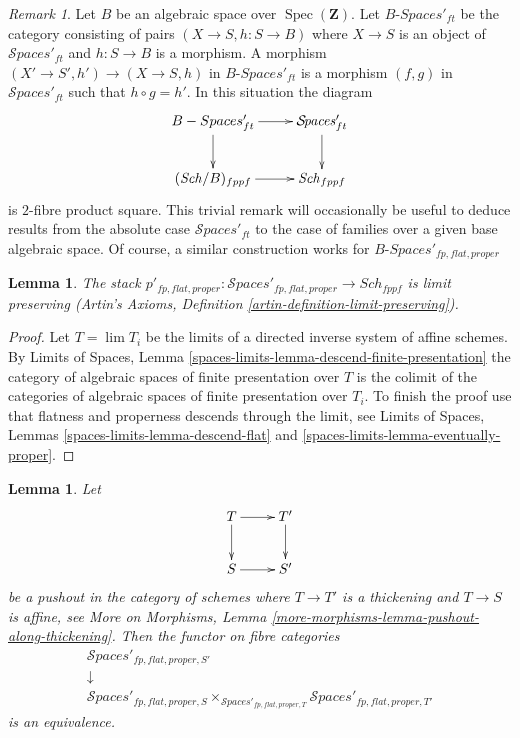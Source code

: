 \documentclass{stacks-project}
\theoremstyle{plain}
\newtheorem{lemma}[subsection]{Lemma}
\theoremstyle{definition}
\theoremstyle{remark}
\newtheorem{remark}[subsection]{Remark}
\numberwithin{equation}{subsection}
\def\lim{\mathop{\mathrm{lim}}\nolimits}
\def\Spec{\mathop{\mathrm{Spec}}}
\def\Sch{\mathit{Sch}}
\def\Spacesstack{\mathcal{S}\!\mathit{paces}}
\begin{document}
\begin{remark}
\label{remark-spaces-base-change}
Let $B$ be an algebraic space over $\Spec(\mathbf{Z})$.
Let $B\textit{-Spaces}'_{ft}$ be the category consisting
of pairs $(X \to S, h : S \to B)$
where $X \to S$ is an object of
$\Spacesstack'_{ft}$ and $h : S \to B$ is a morphism.
A morphism $(X' \to S', h') \to (X \to S, h)$
in $B\textit{-Spaces}'_{ft}$ is a morphism $(f, g)$
in $\Spacesstack'_{ft}$ such that $h \circ g = h'$.
In this situation the diagram
$$
\xymatrix{
B\textit{-Spaces}'_{ft} \ar[r] \ar[d] & \Spacesstack'_{ft} \ar[d] \\
(\Sch/B)_{fppf} \ar[r] & \Sch_{fppf}
}
$$
is $2$-fibre product square. This trivial remark
will occasionally be useful to deduce results from
the absolute case $\Spacesstack'_{ft}$ to the case
of families over a given base algebraic space.
Of course, a similar construction works for
$B\textit{-Spaces}'_{fp, flat, proper}$
\end{remark}

\begin{lemma}
\label{lemma-spaces-limits}
The stack
$p'_{fp, flat, proper} :
\Spacesstack'_{fp, flat, proper} \to \Sch_{fppf}$ is limit preserving
(Artin's Axioms, Definition \ref{artin-definition-limit-preserving}).
\end{lemma}

\begin{proof}
Let $T = \lim T_i$ be the limits of a
directed inverse system of affine schemes.
By Limits of Spaces, Lemma
\ref{spaces-limits-lemma-descend-finite-presentation}
the category of algebraic spaces of finite presentation
over $T$ is the colimit of the categories of algebraic spaces
of finite presentation over $T_i$.
To finish the proof use that flatness and properness
descends through the limit, see
Limits of Spaces, Lemmas
\ref{spaces-limits-lemma-descend-flat} and
\ref{spaces-limits-lemma-eventually-proper}.
\end{proof}

\begin{lemma}
\label{lemma-spaces-RS-star}
Let
$$
\xymatrix{
T \ar[r] \ar[d] & T' \ar[d] \\
S \ar[r] & S'
}
$$
be a pushout in the category of schemes where
$T \to T'$ is a thickening and $T \to S$ is affine, see
More on Morphisms, Lemma \ref{more-morphisms-lemma-pushout-along-thickening}.
Then the functor on fibre categories
$$
\begin{matrix}
\Spacesstack'_{fp, flat, proper, S'} \\
\downarrow \\
\Spacesstack'_{fp, flat, proper, S}
\times_{\Spacesstack'_{fp, flat, proper, T}}
\Spacesstack'_{fp, flat, proper, T'}
\end{matrix}
$$
is an equivalence.
\end{lemma}
\end{document}
